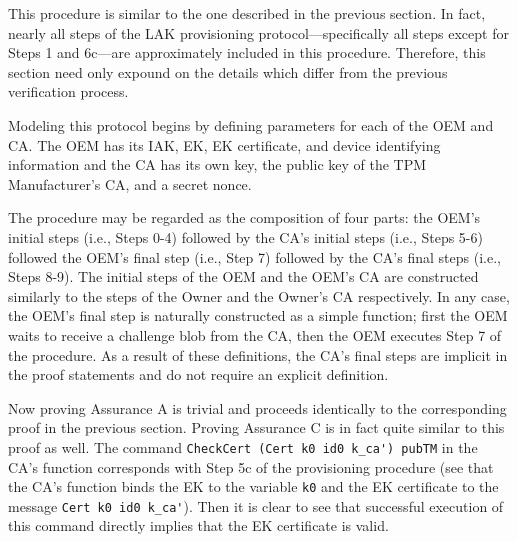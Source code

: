 \documentclass[runningheads]{llncs}
\begin{document}
This procedure is similar to the one described in the previous section. In fact, nearly all steps of the LAK provisioning protocol---specifically all steps except for Steps 1 and 6c---are approximately included in this procedure. Therefore, this section need only expound on the details which differ from the previous verification process. 

Modeling this protocol begins by defining parameters for each of the
OEM and CA. The OEM has its IAK, EK, EK certificate, and device
identifying information and the CA has its own key, the public key of
the TPM Manufacturer's CA, and a secret nonce.



The procedure may be regarded as the composition of four parts: the OEM's initial steps (i.e., Steps 0-4) followed by the CA's initial steps (i.e., Steps 5-6) followed the OEM's final step (i.e., Step 7) followed by the CA's final steps (i.e., Steps 8-9). The initial steps of the OEM and the OEM's CA are constructed similarly to the steps of the Owner and the Owner's CA respectively. In any case, the OEM's final step is naturally constructed as a simple function; first the OEM waits to receive a challenge blob from the CA, then the OEM executes Step 7 of the procedure. As a result of these definitions, the CA's final steps are implicit in the proof statements and do not require an explicit definition. 

Now proving Assurance A is trivial and proceeds identically to the
corresponding proof in the previous section. Proving Assurance C is in
fact quite similar to this proof as well. The command
\verb|CheckCert (Cert k0 id0 k_ca') pubTM| in the CA's function
corresponds with Step 5c of the provisioning procedure (see that the
CA's function binds the EK to the variable \verb|k0| and the EK
certificate to the message \verb|Cert k0 id0 k_ca'|).  Then it is clear to see that successful execution of this command directly implies that the EK certificate is valid.
\end{document}

